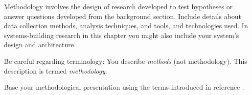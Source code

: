 Methodology involves the design of research developed to test hypotheses
or answer questions developed from the background section.
Include details about data collection methods, analysis techniques,
and tools, and technologies used.
In systems-building research in this chapter you might also include
your system's design and architecture.

Be careful regarding terminology: You describe \emph{methods} (not
methodology).  This description is termed \emph{methodology}.

Base your methodological presentation using the terms
introduced in reference \cite{SF18}.
